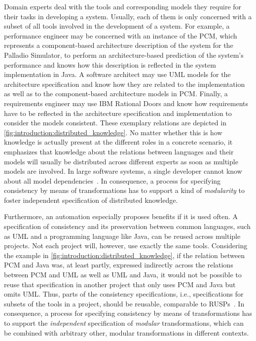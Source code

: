 Domain experts deal with the tools and corresponding models they require for their tasks in developing a system.
Usually, each of them is only concerned with a subset of all tools involved in the development of a system.
For example, a performance engineer may be concerned with an instance of the \gls{PCM}, which represents a component-based architecture description of the system for the Palladio Simulator, to perform an architecture-based prediction of the system's performance and knows how this description is reflected in the system implementation in Java.
A software architect may use \gls{UML} models for the architecture specification and know how they are related to the implementation as well as to the component-based architecture models in \gls{PCM}.
Finally, a requirements engineer may use IBM Rational Doors and know how requirements have to be reflected in the architecture specification and implementation to consider the models consistent.
These exemplary relations are depicted in \autoref{fig:introduction:distributed_knowledge}.
No matter whether this is how knowledge is actually present at the different roles in a concrete scenario, it emphasizes that knowledge about the relations between languages and their models will usually be distributed across different experts as soon as multiple models are involved.
In large software systems, a single developer cannot know about all model dependencies~\cite{petrenko2008a}.
In consequence, a process for specifying consistency by means of transformations has to support a kind of \emph{modularity} to foster independent specification of distributed knowledge.

Furthermore, an automation especially proposes benefits if it is used often.
A specification of consistency and its preservation between common languages, such as \gls{UML} and a programming language like Java, can be reused across multiple projects.
Not each project will, however, use exactly the same tools.
Considering the example in \autoref{fig:introduction:distributed_knowledge}, if the relation between \gls{PCM} and Java was, at least partly, expressed indirectly across the relations between \gls{PCM} and \gls{UML} as well as \gls{UML} and Java, it would not be possible to reuse that specification in another project that only uses \gls{PCM} and Java but omits \gls{UML}.
Thus, parts of the consistency specifications, i.e., specifications for subsets of the tools in a project, should be reusable, comparable to \glspl{RUSP}~\cite{iso25051}.
In consequence, a process for specifying consistency by means of transformations has to support the \emph{independent} specification of \emph{modular} transformations, which can be combined with arbitrary other, modular transformations in different contexts.

